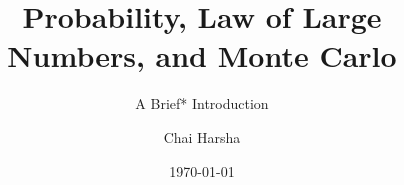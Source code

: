 \documentclass[
    aspectratio = 169,
    ]{beamer}
\title{Probability, Law of Large Numbers, and Monte Carlo}
\subtitle{A Brief* Introduction}
\author{Chai Harsha}
\institute{Brown University}
\date{\today}
\begin{document}
\begin{frame}
    \titlepage
\end{frame}
\end{document}
